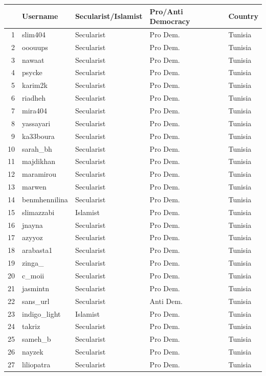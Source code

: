 \documentclass[12pt]{article}
\begin{document}
\begin{longtable}{rllll}
	\hline
	& Username & Secularist/Islamist & Pro/Anti Democracy & Country \\ 
	\hline
	1 & slim404 & Secularist & Pro Dem. & Tunisia \\ 
	2 & ooouups & Secularist & Pro Dem. & Tunisia \\ 
	3 & nawaat & Secularist & Pro Dem. & Tunisia \\ 
	4 & psycke & Secularist & Pro Dem. & Tunisia \\ 
	5 & karim2k & Secularist & Pro Dem. & Tunisia \\ 
	6 & riadheh & Secularist & Pro Dem. & Tunisia \\ 
	7 & mira404 & Secularist & Pro Dem. & Tunisia \\ 
	8 & yassayari & Secularist & Pro Dem. & Tunisia \\ 
	9 & ka33boura & Secularist & Pro Dem. & Tunisia \\ 
	10 & sarah\_bh & Secularist & Pro Dem. & Tunisia \\ 
	11 & majdikhan & Secularist & Pro Dem. & Tunisia \\ 
	12 & maramirou & Secularist & Pro Dem. & Tunisia \\ 
	13 & marwen & Secularist & Pro Dem. & Tunisia \\ 
	14 & benmhennilina & Secularist & Pro Dem. & Tunisia \\ 
	15 & slimazzabi & Islamist & Pro Dem. & Tunisia \\ 
	16 & jnayna & Secularist & Pro Dem. & Tunisia \\ 
	17 & azyyoz & Secularist & Pro Dem. & Tunisia \\ 
	18 & arabasta1 & Secularist & Pro Dem. & Tunisia \\ 
	19 & zinga\_ & Secularist & Pro Dem. & Tunisia \\ 
	20 & c\_moii & Secularist & Pro Dem. & Tunisia \\ 
	21 & jasmintn & Secularist & Pro Dem. & Tunisia \\ 
	22 & sans\_url & Secularist & Anti Dem. & Tunisia \\ 
	23 & indigo\_light & Islamist & Pro Dem. & Tunisia \\ 
	24 & takriz & Secularist & Pro Dem. & Tunisia \\ 
	25 & sameh\_b & Secularist & Pro Dem. & Tunisia \\ 
	26 & nayzek & Secularist & Pro Dem. & Tunisia \\ 
	27 & liliopatra & Secularist & Pro Dem. & Tunisia \\ 

\end{longtable}
\end{document}
